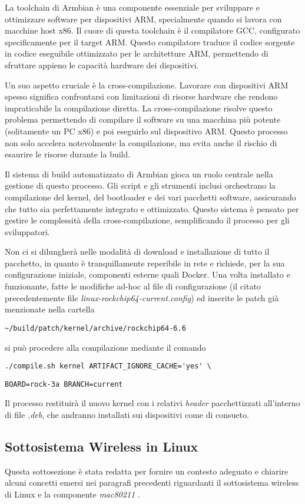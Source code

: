 La toolchain di Armbian è una componente essenziale per sviluppare e ottimizzare software per dispositivi ARM, specialmente quando si lavora con macchine host x86. Il cuore di questa toolchain è il compilatore GCC, configurato specificamente per il target ARM. Questo compilatore traduce il codice sorgente in codice eseguibile ottimizzato per le architetture ARM, permettendo di sfruttare appieno le capacità hardware dei dispositivi.

Un suo aspetto cruciale è la cross-compilazione. Lavorare con dispositivi ARM spesso significa confrontarsi con limitazioni di risorse hardware che rendono impraticabile la compilazione diretta. La cross-compilazione risolve questo problema permettendo di compilare il software su una macchina più potente (solitamente un PC x86) e poi eseguirlo sul dispositivo ARM. Questo processo non solo accelera notevolmente la compilazione, ma evita anche il rischio di esaurire le risorse durante la build.

Il sistema di build automatizzato di Armbian gioca un ruolo centrale nella gestione di questo processo. Gli script e gli strumenti inclusi orchestrano la compilazione del kernel, del bootloader e dei vari pacchetti software, assicurando che tutto sia perfettamente integrato e ottimizzato. Questo sistema è pensato per gestire le complessità della cross-compilazione, semplificando il processo per gli sviluppatori.

Non ci si dilungherà nelle modalità di download e installazione di tutto il pacchetto, in quanto è tranquillamente reperibile in rete e richiede, per la sua configurazione iniziale, componenti esterne quali Docker. Una volta installato e funzionante, fatte le modifiche ad-hoc al file di configurazione (il citato precedentemente file \textit{linux-rockchip64-current.config}) ed inserite le patch già menzionate nella cartella

\verb|~/build/patch/kernel/archive/rockchip64-6.6 |

\noindent si può procedere alla compilazione mediante il comando 

\verb|./compile.sh kernel ARTIFACT_IGNORE_CACHE='yes' \| 

\verb|BOARD=rock-3a BRANCH=current|

\noindent Il processo restituirà il nuovo kernel con i relativi \textit{header} pacchettizzati all'interno di file \textit{.deb}, che andranno installati sui dispositivi come di consueto.

\subsection{Sottosistema Wireless in Linux}
\label{subsystem}
Questa sottosezione è stata redatta per fornire un contesto adeguato e chiarire alcuni concetti emersi nei paragrafi precedenti riguardanti il sottosistema wireless di Linux e la componente \textit{mac80211} \cite{short_walk}.

